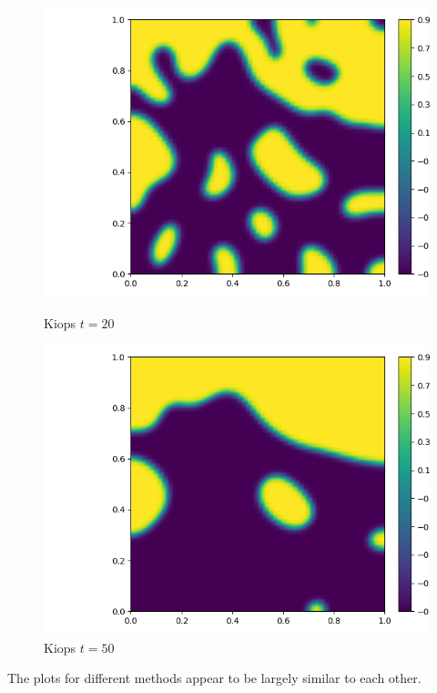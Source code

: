 \documentclass{article}
\begin{document}
\begin{figure}[H]
    \centering
    \begin{minipage}{0.5\textwidth}
       \centering
	  \includegraphics[width=\linewidth]{FEPics/Allen Cahn Test2_60x60_0.025_EXPKIOPS_EndTime=20.png}
	  \caption{Kiops $t=20$}
    \end{minipage}\hfill
    \begin{minipage}{0.5\textwidth}
       \centering
	  \includegraphics[width=\linewidth]{FEPics/Allen Cahn Test2_60x60_0.025_EXPKIOPS_EndTime=50.png}
	  \caption{Kiops $t=50$}
    \end{minipage}
\end{figure}

The plots for different methods appear to be largely similar to each other.
\end{document}
